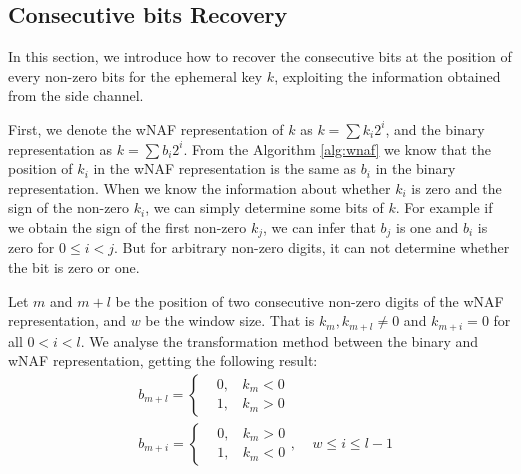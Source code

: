 






\subsection{Consecutive bits Recovery}
\label{data_proc1}
In this section, we introduce how to recover the consecutive bits at the position of every non-zero bits for the ephemeral key $k$, exploiting the information obtained from the side channel.

First, we denote the wNAF representation of $k$ as $k = \sum{k_{i}2^{i}}$,
 and the binary representation as $k = \sum{b_{i}2^{i}}$.
From the Algorithm \ref{alg:wnaf} we know that the position of $k_i$ in the wNAF representation is the same as $b_i$ in the binary representation.
 When we know the information about whether $k_i$ is zero and the sign of the non-zero $k_i$, we can simply determine some bits of $k$.
 For example if we obtain the sign of the first non-zero $k_j$, we can infer that $b_j$ is one and $b_i$ is zero for $0\leq i<j$.
 But for arbitrary non-zero digits, it can not determine whether the bit is zero or one.

 Let $m$ and $m + l$ be the position of two consecutive non-zero digits of the wNAF representation, and $w$ be the window size.
 That is $k_m, k_{m+l} \neq 0$ and $k_{m+i} = 0$ for all $0 < i < l$.
 We analyse the transformation method between the binary and wNAF representation, getting the following result:
 \begin{align}
 &b_{m+l} = \left\{
 \begin{aligned}
 	&0,\,\;\ \   k_m < 0 \\
 	&1,\,\;\ \   k_m > 0
 \end{aligned}
 \right.   \\
 &b_{m+i} = \left\{
 \begin{aligned}
 	&0,\,\;\ \   k_m > 0 \\
 	&1,\,\;\ \   k_m < 0
 \end{aligned}
 \right.
 ,\ \ \ \ \  w \leq i \leq l-1
 \end{align}

